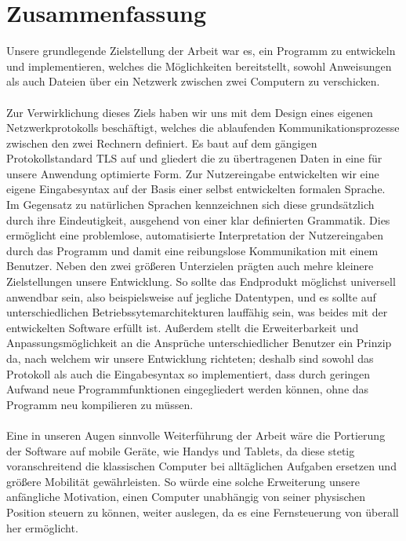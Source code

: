 %

%
\section*{Zusammenfassung}
Unsere grundlegende Zielstellung der Arbeit war es, ein Programm zu entwickeln und implementieren, welches die Möglichkeiten bereitstellt, sowohl Anweisungen als auch Dateien über ein Netzwerk zwischen zwei Computern zu verschicken.\\\\
Zur Verwirklichung dieses Ziels haben wir uns mit dem Design eines eigenen Netzwerkprotokolls beschäftigt, welches die ablaufenden Kommunikationsprozesse zwischen den zwei Rechnern definiert. 
Es baut auf dem gängigen Protokollstandard TLS auf und gliedert die zu übertragenen Daten in eine für unsere Anwendung optimierte Form. 
Zur Nutzereingabe entwickelten wir eine eigene Eingabesyntax auf der Basis einer selbst entwickelten formalen Sprache. 
Im Gegensatz zu natürlichen Sprachen kennzeichnen sich diese grundsätzlich durch ihre Eindeutigkeit, ausgehend von einer klar definierten Grammatik. 
Dies ermöglicht eine problemlose, automatisierte Interpretation der Nutzereingaben durch das Programm und damit eine reibungslose Kommunikation mit einem Benutzer.
Neben den zwei größeren Unterzielen prägten auch mehre kleinere Zielstellungen unsere Entwicklung.
So sollte das Endprodukt möglichst universell anwendbar sein, also beispielsweise auf jegliche Datentypen, und es sollte auf unterschiedlichen Betriebssytemarchitekturen lauffähig sein, was beides mit der entwickelten Software erfüllt ist.
Außerdem stellt die Erweiterbarkeit und Anpassungsmöglichkeit an die Ansprüche unterschiedlicher Benutzer ein Prinzip da, nach welchem wir unsere Entwicklung richteten; deshalb sind sowohl das Protokoll als auch die Eingabesyntax so implementiert, dass durch geringen Aufwand neue Programmfunktionen eingegliedert werden können, ohne das Programm neu kompilieren zu müssen.\\\\
Eine in unseren Augen sinnvolle Weiterführung der Arbeit wäre die Portierung der Software auf mobile Geräte, wie Handys und Tablets, da diese stetig voranschreitend die klassischen Computer bei alltäglichen Aufgaben ersetzen und größere Mobilität gewährleisten. 
So würde eine solche Erweiterung unsere anfängliche Motivation, einen Computer unabhängig von seiner physischen Position steuern zu können, weiter auslegen, da es eine Fernsteuerung von überall her ermöglicht. 
